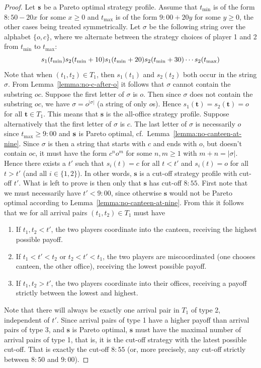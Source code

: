 \documentclass[twocolumn,a4paper,superscriptaddress,nofootinbib]{revtex4}
\newcommand{\tmin}{t_{\min}}
\newcommand{\tmax}{t_{\max}}
\begin{document}
\begin{proof}
Let $\bf s$ be a Pareto optimal strategy profile. Assume that $\tmin$ is of the form $8{:}50-20x$ for some $x \geq 0$ and $\tmax$ is of the form $9{:}00+20y$ for some $y \geq 0$, the other cases being treated symmetrically. Let $\sigma$ be the following string over the alphabet $\{o,c\}$, where we alternate between the strategy choices of player 1 and 2 from $\tmin$ to $\tmax$:
\[
s_1(\tmin) s_2(\tmin + 10) s_1(\tmin + 20) s_2(\tmin + 30)  \cdots 
s_2(\tmax) \\
\]
Note that when $(t_1,t_2) \in T_1$, then $s_1(t_1)$ and $s_2(t_2)$ both occur in the string $\sigma$. From Lemma~\ref{lemma:no-c-after-o} it follows that $\sigma$ cannot contain the substring $oc$. Suppose the first letter of $\sigma$ is $o$. Then since $\sigma$ does not contain the substring $oc$, we have $\sigma = o^{|\sigma|}$ (a string of only $o$s). Hence $s_1(\mathbf{t}) = s_2(\mathbf{t}) = o$ for all $\mathbf{t} \in T_1$. This means that $\mathbf{s}$ is the all-office strategy profile. Suppose alternatively that the first letter of $\sigma$ is $c$. The last letter of $\sigma$ is necessarily $o$ since $\tmax \geq 9{:}00$ and $\bf s$ is Pareto optimal, cf.\ Lemma~\ref{lemma:no-canteen-at-nine}. Since $\sigma$ is then a string that starts with $c$ and ends with $o$, but doesn't contain $oc$, it must have the form $c^n o^m$ for some $n, m \geq 1$ with $m+n=|\sigma|$. Hence there exists a $t'$ such that $s_i(t) = c$ for all $t < t'$ and $s_i(t) = o$ for all $t > t'$ (and all $i \in \{1,2\}$).
In other words, $\mathbf{s}$ is a cut-off strategy profile with cut-off $t'$. What is left to prove is then only that $\mathbf{s}$ has cut-off $8{:}55$. First note that we must necessarily have $t' < 9{:}00$, since otherwise $\mathbf{s}$ would not be Pareto optimal according to Lemma~\ref{lemma:no-canteen-at-nine}. From this it follows that we for all arrival pairs $(t_1,t_2) \in T_1$ must have
\begin{enumerate}
  \item If $t_1,t_2 < t'$, the two players coordinate into the canteen, receiving the highest possible payoff.
  \item If $t_1 < t' < t_2$ or $t_2 < t' < t_1$, the two players are miscoordinated (one chooses canteen, the other office), receiving the lowest possible payoff.
  \item If $t_1,t_2 > t'$, the two players coordinate into their offices, receiving a payoff strictly between the lowest and highest.
\end{enumerate}
Note that there will always be exactly one arrival pair in $T_1$ of type 2, independent of $t'$. Since arrival pairs of type 1 have a higher payoff than arrival pairs of type 3, and $\mathbf{s}$ is Pareto optimal, $\mathbf{s}$ must have the maximal number of arrival pairs of type 1, that is, it is the cut-off strategy with the latest possible cut-off. That is exactly the cut-off $8{:}55$ (or, more precisely, any cut-off strictly between $8{:}50$ and $9{:}00$).
\end{proof}
\end{document}
